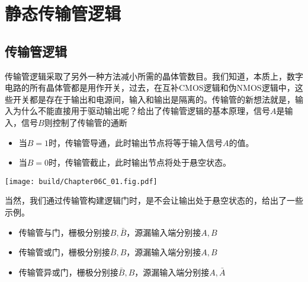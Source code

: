 \section{静态传输管逻辑}

\subsection{传输管逻辑}
传输管逻辑采取了另外一种方法减小所需的晶体管数目。我们知道，本质上，数字电路的所有晶体管都是用作开关，过去，在互补CMOS逻辑和伪NMOS逻辑中，这些开关都是存在于输出和电源间，输入和输出是隔离的。传输管的新想法就是，输入为什么不能直接用于驱动输出呢？给出了传输管逻辑的基本原理，信号$A$是输入，信号$B$则控制了传输管的通断
\begin{itemize}
    \item 当$B=1$时，传输管导通，此时输出节点将等于输入信号$A$的值。
    \item 当$B=0$时，传输管截止，此时输出节点将处于悬空状态。
\end{itemize}

\begin{Figure}[传输管的基本原理]
    \texttt{[image: build/Chapter06C\_01.fig.pdf]}
\end{Figure}

当然，我们通过传输管构建逻辑门时，是不会让输出处于悬空状态的，给出了一些示例。
\begin{itemize}
    \item 传输管与门\hphantom{门}，栅极分别接$B,\bar{B}$，源漏输入端分别接$A,B$
    \item 传输管或门\hphantom{门}，栅极分别接$\bar{B},B$，源漏输入端分别接$A,B$
    \item 传输管异或门，栅极分别接$\bar{B},B$，源漏输入端分别接$A,\bar{A}$
\end{itemize}

